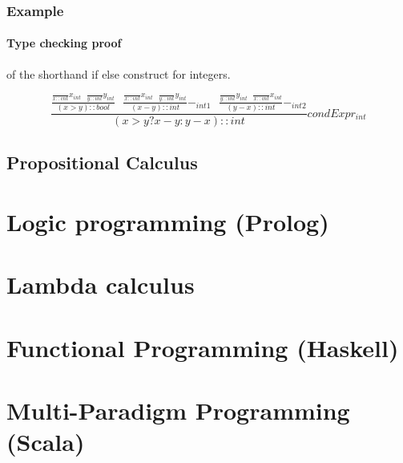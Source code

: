 \subsubsection{Example}

\paragraph{Type checking proof}

of the shorthand if else construct for integers.

\[
	\frac{
			\frac{
				\frac{}{x::int}x_{int} \text{   } \frac{}{y::int}y_{int}
			}{(x > y)::bool} \text{   }
		  \frac{
				\frac{}{x::int}x_{int} \text{   } \frac{}{y::int}y_{int}
			}{(x - y)::int} -_{int1} \text{   }
			\frac{
				\frac{}{y::int}y_{int} \text{   } \frac{}{x::int}x_{int}
			}{(y - x)::int} -_{int2}
		}{(x>y? x - y : y - x)::int} condExpr_{int}
\]

\subsection{Propositional Calculus}


\section{Logic programming (Prolog)}

\section{Lambda calculus}

\section{Functional Programming (Haskell)}

\section{Multi-Paradigm Programming (Scala)}



